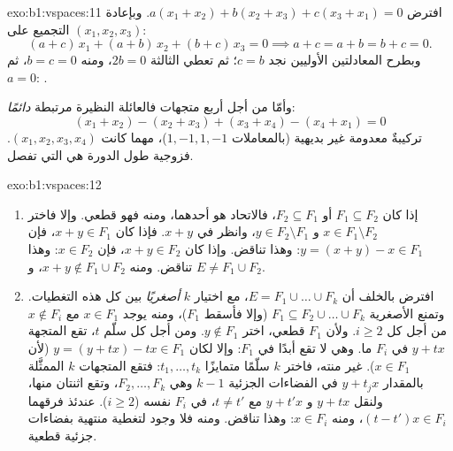 \begin{solution}{exo:b1:vspaces:11}
افترض $a(x_1 + x_2) + b(x_2 + x_3) + c(x_3 + x_1) = 0$.
وبإعادة التجميع على  $(x_1, x_2, x_3)$:
\[
(a + c)\,x_1 + (a + b)\,x_2 + (b + c)\,x_3 = 0
\implies a + c = a + b = b + c = 0 .
\]
وبطرح المعادلتين الأوليين نجد $c = b$؛ ثم تعطي الثالثة
$2b = 0$، ومنه $b = c = 0$، ثم $a = 0$: .

وأمّا من أجل أربع متجهات فالعائلة النظيرة مرتبطة \emph{دائمًا}:
\[
(x_1 + x_2) - (x_2 + x_3) + (x_3 + x_4) - (x_4 + x_1) = 0
\]
تركيبةٌ معدومة غير بديهية (بالمعاملات $1, -1, 1, -1$)،
مهما كانت $(x_1, x_2, x_3, x_4)$. فزوجية طول الدورة
هي التي تفصل.
\end{solution}

\begin{solution}{exo:b1:vspaces:12}
\begin{enumerate}
  \item إذا كان $F_1 \subseteq F_2$ أو $F_2 \subseteq F_1$، فالاتحاد
        هو أحدهما، ومنه فهو قطعي. وإلا فاختر $x \in F_1
        \setminus F_2$ و $y \in F_2 \setminus F_1$، وانظر في
        $x + y$. فإذا كان $x + y \in F_1$، فإن $y = (x + y) - x \in
        F_1$: وهذا تناقض. وإذا كان $x + y \in F_2$، فإن $x \in F_2$:
        وهذا تناقض. ومنه $x + y \notin F_1 \cup F_2$، و $E \neq
        F_1 \cup F_2$.
  \item افترض بالخلف أن $E = F_1 \cup \dots \cup
        F_k$، مع اختيار $k$ \emph{أصغريًا} بين كل هذه
        التغطيات. وتمنع الأصغرية $F_1 \subseteq F_2 \cup
        \dots \cup F_k$ (وإلا فأسقط $F_1$)، ومنه يوجد $x \in F_1$
        مع $x \notin F_i$ من أجل كل $i \geq 2$. ولأن $F_1$
        قطعي، اختر $y \notin F_1$. ومن أجل كل سلّم $t$، تقع
        المتجهة $y + t x$ في $F_i$ ما. وهي لا تقع أبدًا في
        $F_1$: وإلا لكان $y = (y + tx) - tx \in F_1$ (لأن $x \in
        F_1$).  غير منته، فاختر $k$ سلّمًا
        متمايزًا $t_1, \dots, t_k$: فتقع المتجهات $k$ الممثَّلة بالمقدار $y + t_j x$
        في الفضاءات الجزئية $k - 1$ وهي $F_2, \dots, F_k$، وتقع اثنتان
        منها، ولنقل $y + t x$ و $y + t' x$ مع $t \neq t'$،
        في $F_i$ نفسه ($i \geq 2$). عندئذ فرقهما
        $(t - t')x \in F_i$، ومنه $x \in F_i$: وهذا تناقض. ومنه
        فلا وجود لتغطية منتهية بفضاءات جزئية قطعية.
\end{enumerate}
\end{solution}

